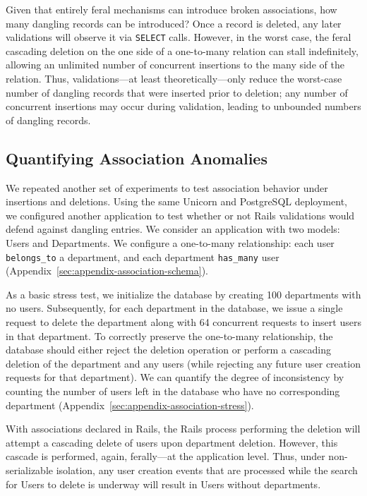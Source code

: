  Given that entirely
feral mechanisms can introduce broken associations, how many dangling
records can be introduced? Once a record is deleted, any later
validations will observe it via \texttt{SELECT} calls. However, in the
worst case, the feral cascading deletion on the one side of a
one-to-many relation can stall indefinitely, allowing an unlimited
number of concurrent insertions to the many side of the
relation. Thus, validations---at least theoretically---only reduce the
worst-case number of dangling records that were inserted prior to
deletion; any number of concurrent insertions may occur during
validation, leading to unbounded numbers of dangling records.

\subsection{Quantifying Association Anomalies}

We repeated another set of experiments to test association behavior
under insertions and deletions. Using the same Unicorn and PostgreSQL
deployment, we configured another application to test whether or not
Rails validations would defend against dangling entries. We consider
an application with two models: Users and Departments. We configure a
one-to-many relationship: each user \texttt{belongs\_to} a department,
and each department \texttt{has\_many} user
(Appendix~\ref{sec:appendix-association-schema}).

As a basic stress test, we initialize the database by creating 100
departments with no users. Subsequently, for each department in the
database, we issue a single request to delete the department along
with 64 concurrent requests to insert users in that department. To
correctly preserve the one-to-many relationship, the database should
either reject the deletion operation or perform a cascading deletion
of the department and any users (while rejecting any future user
creation requests for that department). We can quantify the degree of
inconsistency by counting the number of users left in the database who
have no corresponding department (Appendix~\ref{sec:appendix-association-stress}).

With associations declared in Rails, the Rails process performing the
deletion will attempt a cascading delete of users upon department
deletion. However, this cascade is performed, again, ferally---at the
application level. Thus, under non-serializable isolation, any user creation
events that are processed while the search for Users to delete is
underway will result in Users without departments.

